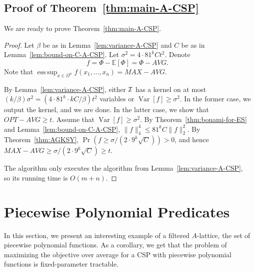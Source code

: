 \documentclass[11pt]{article}
\DeclareMathOperator*{\esssup}{ess\,sup}
\DeclareMathOperator {\Var}  {Var}
\newcommand {\brc}   [1] {\left(#1\right)}
\newcommand {\Exp}       {\mathbb{E}}
\newcommand {\Prob}  [1] {\Pr \brc{#1 }}
\newcommand {\E}     [1] {\Exp\left[#1\right]}
\newcommand {\Varr}  [1] {\Var \left[#1\right]}
\begin{document}
\subsection{Proof of Theorem~\ref{thm:main-A-CSP}}
We are ready to prove Theorem~\ref{thm:main-A-CSP}.
\smallskip
\begin{proof}
Let $\beta$ be as in Lemma~\ref{lem:variance-A-CSP} and $C$ be as in Lemma~\ref{lem:bound-on-C-A-CSP}.
Let $\sigma^2 = 4 \cdot 81^k C t^2$. Denote $$f= \Phi - \E{\Phi} = \Phi - AVG.$$ Note that $\esssup_{x\in\Omega^n} f(x_1,\dots, x_n) = MAX - AVG$.

By Lemma~\ref{lem:variance-A-CSP}, either $\cal I$ has a kernel on at most $(k/\beta) \sigma^2 = (4 \cdot 81^k \cdot k C/\beta) t^2 $ variables or
$\Varr{f} \geq \sigma^2$. In the former case, we output the kernel, and we are done. In the latter case, we show that $OPT - AVG \geq t$. Assume that $\Varr{f} \geq \sigma^2$. By
Theorem~\ref{thm:bonami-for-ES} and Lemma~\ref{lem:bound-on-C-A-CSP},
$\|f\|_4^4 \leq 81^k C \|f\|_2^2$.
By Theorem~\ref{thm:AGKSY}, $\Prob{f \geq \sigma / (2 \cdot 9^k \sqrt{C})} > 0$, and hence $MAX - AVG \geq \sigma / (2 \cdot 9^k \sqrt{C}) \geq t$.

The algorithm only executes the algorithm from Lemma~\ref{lem:variance-A-CSP}, so its running time is $O(m+n)$.
\end{proof}

\section{Piecewise Polynomial Predicates}\label{sec:PPP}
In this section, we present an interesting example of a filtered $A$-lattice, the set of piecewise polynomial functions.  As a corollary,
we get that  the problem of maximizing the objective over average for a CSP with piecewise polynomial functions is fixed-parameter tractable.
\end{document}
